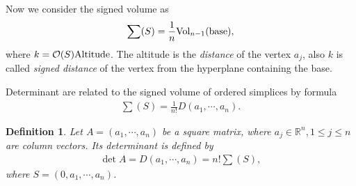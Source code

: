 \documentclass[11pt]{book}
\newtheorem{definition}{Definition}[chapter]
\theoremstyle{definition}
\numberwithin{equation}{chapter}
\begin{document}
Now we consider the signed volume as
\begin{align*}
    \sum (S) =\frac{1}{n}{\rm Vol}_{n-1}({\rm base}),
\end{align*}
where $k = \mathcal{O}(S) {\rm Altitude}$. The altitude is the \emph{distance} of the vertex $a_j$, also $k$ is called \emph{signed distance} of the vertex from the hyperplane containing the base. 

Determinant are related to the signed volume of ordered simplices by formula
\begin{align*}
    \sum (S) = \frac{1}{n!}D(a_1,\cdots,a_n).
\end{align*}

\medskip

\begin{definition}
Let $A = (a_1,\cdots, a_n)$ be a square matrix, where $a_j\in\mathbb{R}^n, 1\leq j\leq n$ are column vectors. Its determinant is defined by 
\begin{align*}
    \det A = D(a_1,\cdots,a_n) = n! \sum (S),
\end{align*}
where $S = (0,a_1,\cdots,a_n)$.
\end{definition}

\medskip
\end{document}
